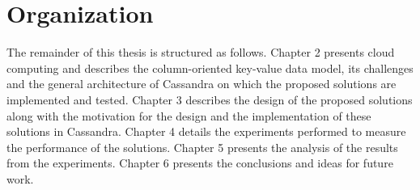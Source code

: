 \section{Organization} 

The remainder of this thesis is structured as follows.
Chapter 2 presents cloud computing and describes the column-oriented key-value
data model, its challenges and the general architecture of Cassandra on which
the proposed solutions are implemented and tested.
Chapter 3 describes the design of the proposed solutions along with the
motivation for the design and the implementation of these solutions in
Cassandra.
Chapter 4 details the experiments performed to measure the performance of the
solutions.
Chapter 5 presents the analysis of the results from the experiments.
Chapter 6  presents the conclusions and ideas for future work.
